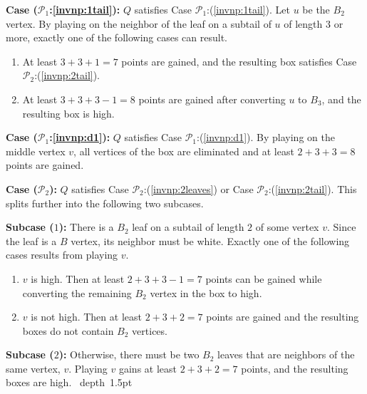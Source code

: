 \documentclass[11pt]{article}
\def\blackslug{\hbox{\hskip 1pt \vrule width 4pt height 8pt
    depth 1.5pt \hskip 1pt}}
\def\QED{\quad\blackslug\lower 8.5pt\null\par}
\def\dnsitem{\vspace{-7pt}\item}
\theoremstyle{definition}
\def\propbr{\mathcal{P}_1}
\def\propbbr{\mathcal{P}_2}
\begin{document}
\bigskip
\par\noindent
{\bf Case ($\propbr$:\ref{invnp:1tail}):}
$Q$ satisfies Case $\propbr$:(\ref{invnp:1tail}). 
Let $u$ be the $B_2$ vertex. 
By playing on the neighbor of the leaf on a subtail of $u$ of length $3$ or more, exactly one of the following cases can result.
\begin{enumerate}
	\dnsitem At least $3 + 3 + 1 = 7$ points are gained, and the resulting box satisfies Case $\propbbr$:(\ref{invnp:2tail}).
	\dnsitem At least $3 + 3 + 3 - 1 = 8$ points are gained after converting $u$ to $B_3$, and the resulting box is high.
\end{enumerate}

\smallskip
\par\noindent
{\bf Case ($\propbr$:\ref{invnp:d1}):}
$Q$ satisfies Case $\propbr$:(\ref{invnp:d1}). 
By playing on the middle vertex $v$, 
all vertices of the box are eliminated and at least $2 + 3 + 3 = 8$ points are gained.

\bigskip
\par\noindent
{\bf Case ($\propbbr$):}
$Q$ satisfies Case $\propbbr$:(\ref{invnp:2leaves}) or Case $\propbbr$:(\ref{invnp:2tail}).
This splits further into the following two subcases.

\smallskip
\par\noindent
{\bf Subcase ($1$):}
	There is a $B_2$ leaf on a subtail of length $2$ of some vertex $v$. Since the leaf is a $B$ vertex, its neighbor must be white.
	Exactly one of the following cases results from playing $v$.
	\begin{enumerate}
		\dnsitem $v$ is high. Then at least $2 + 3 + 3 - 1 = 7$ points can be gained while converting the remaining $B_2$ vertex in the box to high.
		\dnsitem $v$ is not high. Then at least $2 +3 + 2 = 7$ points are gained and the resulting boxes do not contain $B_2$ vertices.
	\end{enumerate}

\par\noindent
{\bf Subcase ($2$):}
	Otherwise, there must be two $B_2$ leaves that are neighbors of the same vertex, $v$.
	Playing $v$ gains at least $2 + 3 + 2 = 7$ points, and the resulting boxes are high.
\QED
\end{document}
